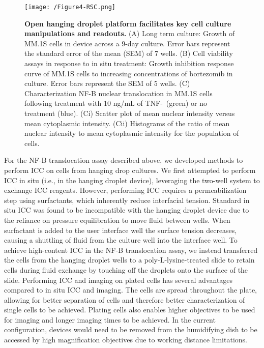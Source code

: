 \begin{figure}[h!] %
\centering
\texttt{[image: /Figure4-RSC.png]}
\caption[\textbf{Open hanging droplet platform facilitates key cell culture manipulations and readouts.}]{\textbf{Open hanging droplet platform facilitates key cell culture manipulations and readouts.} (A) Long term culture: Growth of MM.1S cells in device across a 9-day culture. Error bars represent the standard error of the mean (SEM) of 7 wells. (B) Cell viability assays in response to in situ treatment: Growth inhibition response curve of MM.1S cells to increasing concentrations of bortezomib in culture. Error bars represent the SEM of 5 wells. (C) Characterization NF-\textkappa B nuclear translocation in MM.1S cells following treatment with 10 ng/mL of TNF-\textalpha \, (green) or no treatment (blue). (Ci) Scatter plot of mean nuclear intensity versus mean cytoplasmic intensity. (Cii) Histograms of the ratio of mean nuclear intensity to mean cytoplasmic intensity for the population of cells.}
\label{figure:Fig4}
\end{figure}

For the NF-\textkappa B translocation assay described above, we developed methods to perform ICC on cells from hanging drop cultures. We first attempted to perform ICC in situ (i.e., in the hanging droplet device), leveraging the two-well system to exchange ICC reagents. However, performing ICC requires a permeabilization step using surfactants, which inherently reduce interfacial tension. Standard in situ ICC was found to be incompatible with the hanging droplet device due to the reliance on pressure equilibration to move fluid between wells. When surfactant is added to the user interface well  the surface tension decreases, causing a shuttling of fluid from the culture well into the interface well. To achieve high-content ICC in the NF-\textkappa B translocation assay, we instead transferred the cells from the hanging droplet wells to a poly-L-lysine-treated slide to retain cells during fluid exchange by touching off the droplets onto the surface of the slide.  Performing ICC and imaging on plated cells has several advantages compared to in situ ICC and imaging. The cells are spread throughout the plate, allowing for better separation of cells and therefore better characterization of single cells to be achieved. Plating cells also enables higher objectives to be used for imaging and longer imaging times to be achieved. In the current configuration, devices would need to be removed from the humidifying dish to be accessed by high magnification objectives due to working distance limitations. 

